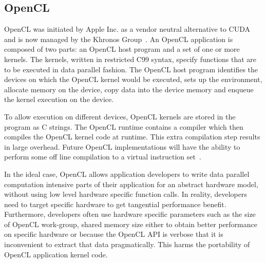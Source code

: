 
\subsection{OpenCL}

OpenCL was initiated by Apple Inc. as a vendor neutral alternative
to CUDA and is now managed by the Khronos Group~\cite{OpenCL_kh}.
An OpenCL application is composed of two parts: an OpenCL host program and a
set of one or more kernels. The kernels, written in restricted C99 syntax,
specify functions that are to be executed in data parallel fashion. The OpenCL
host program identifies the devices on which the OpenCL kernel would be
executed, sets up the environment, allocate memory on the device, copy data
into the device memory and enqueue the kernel execution on the device.


To allow execution on different devices, OpenCL kernels are stored in
	the program as C strings.
The OpenCL runtime contains a compiler which then compiles the OpenCL kernel code at runtime.
This extra compilation step results in large overhead. Future OpenCL implementations
will have the ability to perform some off line compilation to a virtual instruction
set~\cite{SPIR}.

In the ideal case, OpenCL allows application developers to write
data parallel computation intensive parts of their application for an abstract
hardware model, without using low level hardware specific function calls.
In reality, developers need to target specific hardware to get tangential
performance benefit. Furthermore, developers often use hardware specific 
parameters such as the size of OpenCL work-group, shared memory size either 
to obtain better performance on specific hardware or because the OpenCL API
is verbose that it is inconvenient to extract that data pragmatically.
This harms the portability of OpenCL application kernel code.

